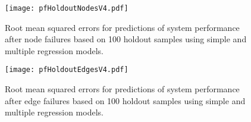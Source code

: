 
\begin{landscape}

\vspace*{\fill}
\centering\vspace*{\fill}

\begin{figure}[!htp]
\centerline{\texttt{[image: pfHoldoutNodesV4.pdf]}}
\caption[Root mean squared errors for predictions of system performance after node failures.]{\label{fig:ch3:pfHoldoutNodes}Root mean squared errors for predictions of system performance after node failures based on 100 holdout samples using simple and multiple regression models.}
\end{figure}

\vspace*{\fill}

\end{landscape}


\begin{landscape}

\vspace*{\fill}
\centering

\begin{figure}[!htp]
\centerline{\texttt{[image: pfHoldoutEdgesV4.pdf]}}
\caption[Root mean squared errors for predictions of system performance after edge failures.]{\label{fig:ch3:pfHoldoutEdges}Root mean squared errors for predictions of system performance after edge failures based on 100 holdout samples using simple and multiple regression models.}
\end{figure}

\vspace*{\fill}

\end{landscape}




